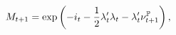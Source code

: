 \begin{equation} \label{eq:nSDF}
	M_{t+1} = \exp\left( -i_{t} -\frac{1}{2} \lambda_{t}' \lambda_{t} - \lambda_{t}' \nu_{t+1}^{\mathbb{P}} \right),
\end{equation}